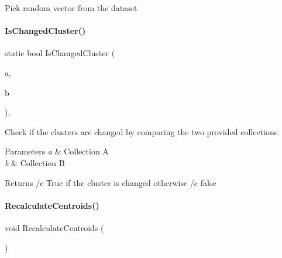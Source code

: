 Pick random vector from the dataset \mbox{\label{classDataTools_1_1clustering_1_1Kmeans_a9347cabe7e34cd6847d27df3d275195d_a9347cabe7e34cd6847d27df3d275195d}} 
\paragraph{\texorpdfstring{Is\+Changed\+Cluster()}{IsChangedCluster()}}
{\footnotesize\ttfamily static bool Is\+Changed\+Cluster (\begin{DoxyParamCaption}\item[{I\+Enumerable$<$ int $>$}]{a,  }\item[{I\+Read\+Only\+List$<$ int $>$}]{b }\end{DoxyParamCaption})\hspace{0.3cm}{\ttfamily [static]}, {\ttfamily [private]}}

Check if the clusters are changed by comparing the two provided collections 
\begin{DoxyParams}{Parameters}
{\em a} & Collection A \\
\hline
{\em b} & Collection B \\
\hline
\end{DoxyParams}
\begin{DoxyReturn}{Returns}
/c True if the cluster is changed otherwise /c false 
\end{DoxyReturn}
\mbox{\label{classDataTools_1_1clustering_1_1Kmeans_a7fff9b4f946273bc93e33a468c23d1a8_a7fff9b4f946273bc93e33a468c23d1a8}} 
\paragraph{\texorpdfstring{Recalculate\+Centroids()}{RecalculateCentroids()}}
{\footnotesize\ttfamily void Recalculate\+Centroids (\begin{DoxyParamCaption}{ }\end{DoxyParamCaption})\hspace{0.3cm}{\ttfamily [private]}}

